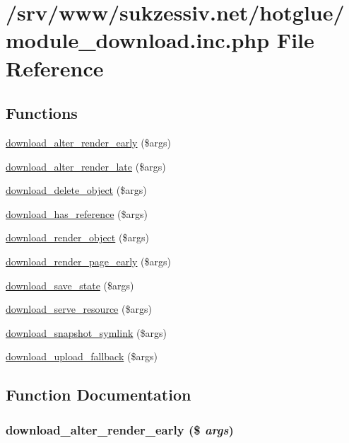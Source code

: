 \hypertarget{module__download_8inc_8php}{
\section{/srv/www/sukzessiv.net/hotglue/module\_\-download.inc.php File Reference}
\label{module__download_8inc_8php}
}
\subsection*{Functions}
\begin{CompactItemize}
\item 
\hyperlink{module__download_8inc_8php_28d1b9ae20de8d1a271f15d308b1df31}{download\_\-alter\_\-render\_\-early} (\$args)
\item 
\hyperlink{module__download_8inc_8php_61a6050abc43cf71d0ca422a9240ae7c}{download\_\-alter\_\-render\_\-late} (\$args)
\item 
\hyperlink{module__download_8inc_8php_5fd781bf1e0393667b227abec7169b28}{download\_\-delete\_\-object} (\$args)
\item 
\hyperlink{module__download_8inc_8php_a80da3f3fd41f7f00f97043f7a2431c8}{download\_\-has\_\-reference} (\$args)
\item 
\hyperlink{module__download_8inc_8php_57c588f1fd0663aa16fd707a522bcc79}{download\_\-render\_\-object} (\$args)
\item 
\hyperlink{module__download_8inc_8php_c980246bec838c65efd59bc25253b005}{download\_\-render\_\-page\_\-early} (\$args)
\item 
\hyperlink{module__download_8inc_8php_2e9ee6868b80832b40e9072a8c644c88}{download\_\-save\_\-state} (\$args)
\item 
\hyperlink{module__download_8inc_8php_930c9545346e8da3f3db5a97dc4d8c74}{download\_\-serve\_\-resource} (\$args)
\item 
\hyperlink{module__download_8inc_8php_e1b136740fb3c1fe26820e1982f8d353}{download\_\-snapshot\_\-symlink} (\$args)
\item 
\hyperlink{module__download_8inc_8php_678bcaf9018d772881b4291020894fa0}{download\_\-upload\_\-fallback} (\$args)
\end{CompactItemize}


\subsection{Function Documentation}
\hypertarget{module__download_8inc_8php_28d1b9ae20de8d1a271f15d308b1df31}{
\subsubsection[{download\_\-alter\_\-render\_\-early}]{\setlength{\rightskip}{0pt plus 5cm}download\_\-alter\_\-render\_\-early (\$ {\em args})}}
\label{module__download_8inc_8php_28d1b9ae20de8d1a271f15d308b1df31}


